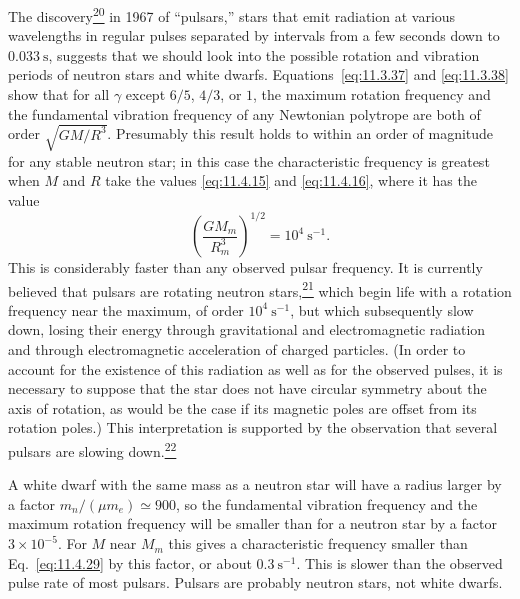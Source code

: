 The discovery\hyperref[ch11-ref-20]{\textsuperscript{20}} in 1967 of
``pulsars,'' stars that emit radiation at various wavelengths in regular
pulses separated by intervals from a few seconds down to \(0.033\ \mathrm{s}\),
suggests that we should look into the possible rotation and vibration periods
of neutron stars and white dwarfs. Equations~\eqref{eq:11.3.37} and
\eqref{eq:11.3.38} show that for all \(\gamma\) except \(6/5\), \(4/3\), or
\(1\), the maximum rotation frequency and the fundamental vibration frequency
of any Newtonian polytrope are both of order \(\sqrt{GM/R^3}\). Presumably
this result holds to within an order of magnitude for any stable neutron star;
in this case the characteristic frequency is greatest when \(M\) and \(R\)
take the values \eqref{eq:11.4.15} and \eqref{eq:11.4.16}, where it has the
value
\begin{equation}
  \left(\frac{GM_m}{R_m^3}\right)^{1/2}
  =
  10^4\ \mathrm{s^{-1}}.
  \tag{11.4.29}\label{eq:11.4.29}
\end{equation}
This is considerably faster than any observed pulsar frequency. It is
currently believed that pulsars are rotating neutron
stars,\hyperref[ch11-ref-21]{\textsuperscript{21}} which begin life with a
rotation frequency near the maximum, of order \(10^4\ \mathrm{s^{-1}}\), but
which subsequently slow down, losing their energy through gravitational and
electromagnetic radiation and through electromagnetic acceleration of charged
particles. (In order to account for the existence of this radiation as well
as for the observed pulses, it is necessary to suppose that the star does not
have circular symmetry about the axis of rotation, as would be the case if its
magnetic poles are offset from its rotation poles.) This interpretation is
supported by the observation that several pulsars are slowing
down.\hyperref[ch11-ref-22]{\textsuperscript{22}}

A white dwarf with the same mass as a neutron star will have a radius larger
by a factor \(m_n/(\mu m_e)\simeq900\), so the fundamental vibration frequency
and the maximum rotation frequency will be smaller than for a neutron star by
a factor \(3\times10^{-5}\). For \(M\) near \(M_m\) this gives a
characteristic frequency smaller than Eq.~\eqref{eq:11.4.29} by this factor,
or about \(0.3\ \mathrm{s^{-1}}\). This is slower than the observed pulse rate
of most pulsars. Pulsars are probably neutron stars, not white dwarfs.
